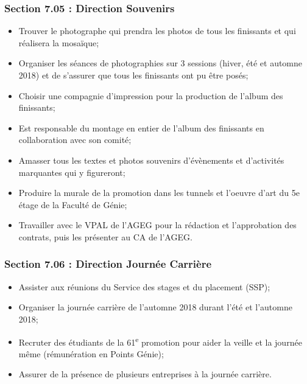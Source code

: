 \subsubsection*{Section 7.05 : Direction Souvenirs}
\begin{itemize}
    \item Trouver le photographe qui prendra les photos de tous les finissants et qui réalisera la mosaïque;
    \item Organiser les séances de photographies sur 3 sessions (hiver, été et automne 2018) et de s’assurer que tous les finissants ont pu être posés;
    \item Choisir une compagnie d’impression pour la production de l’album des finissants;
    \item Est responsable du montage en entier de l’album des finissants en collaboration avec son comité;
    \item Amasser tous les textes et photos souvenirs d’évènements et d’activités marquantes qui y figureront;
    \item Produire la murale de la promotion dans les tunnels et l’oeuvre d’art du 5e étage de la Faculté de Génie;
    \item Travailler avec le VPAL de l’AGEG pour la rédaction et l’approbation des contrats, puis les présenter au CA de l’AGEG.
\end{itemize}

\subsubsection*{Section 7.06 : Direction Journée Carrière}
\begin{itemize}
    \item Assister aux réunions du Service des stages et du placement (SSP);
    \item Organiser la journée carrière de l’automne 2018 durant l’été et l’automne 2018;
    \item Recruter des étudiants de la 61\textsuperscript{e} promotion pour aider la veille et la journée même (rémunération en Points Génie);
    \item Assurer de la présence de plusieurs entreprises à la journée carrière.
\end{itemize}

